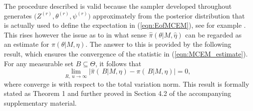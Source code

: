 \documentclass{bioinfo}
\begin{document}
The procedure described is valid because the sampler developed
throughout generates $\big(Z^{(r)}, \theta^{(r)}, \psi^{(r)}\big)$
approximately from the posterior distribution that is actually used to
define the expectation in (\ref{eqn:EofMCEM}), see for example
\cite{FM}. This rises however the issue as to in what sense
$\widehat\pi(\theta|M, \hat\eta)$ can be regarded as an estimate for
$\pi(\theta|M, \eta)$. The answer to this is provided by the following
result, which ensures the convergence of the statistic in
(\ref{eqn:MCEM_estimate}). For any measurable set $B\subseteq
\Theta$, it follows that 
\[
    \lim_{R,\ u\to\infty}
     \Big|
       \widehat\pi(\, B|M, \hat\eta) - \pi(\, B|M,\eta)
     \Big|
   =
    0,
\]
 where converge is with respect to the total variation norm. This
 result is formally stated as Theorem 1 and further proved in Section 
 4.2 of the accompanying supplementary material.




\end{document}
